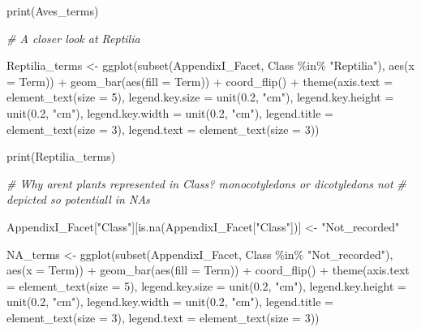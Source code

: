 \documentclass[
  12pt,
]{article}
\newenvironment{Shaded}{\begin{snugshade}}{\end{snugshade}}
\newcommand{\AttributeTok}[1]{\textcolor[rgb]{0.77,0.63,0.00}{#1}}
\newcommand{\CommentTok}[1]{\textcolor[rgb]{0.56,0.35,0.01}{\textit{#1}}}
\newcommand{\DecValTok}[1]{\textcolor[rgb]{0.00,0.00,0.81}{#1}}
\newcommand{\FloatTok}[1]{\textcolor[rgb]{0.00,0.00,0.81}{#1}}
\newcommand{\FunctionTok}[1]{\textcolor[rgb]{0.00,0.00,0.00}{#1}}
\newcommand{\NormalTok}[1]{#1}
\newcommand{\OtherTok}[1]{\textcolor[rgb]{0.56,0.35,0.01}{#1}}
\newcommand{\SpecialCharTok}[1]{\textcolor[rgb]{0.00,0.00,0.00}{#1}}
\newcommand{\StringTok}[1]{\textcolor[rgb]{0.31,0.60,0.02}{#1}}
\begin{document}
\begin{Shaded}
\begin{Highlighting}[]
\FunctionTok{print}\NormalTok{(Aves\_terms)}

\CommentTok{\# A closer look at Reptilia}

\NormalTok{Reptilia\_terms }\OtherTok{\textless{}{-}} \FunctionTok{ggplot}\NormalTok{(}\FunctionTok{subset}\NormalTok{(AppendixI\_Facet, Class }\SpecialCharTok{\%in\%} \StringTok{"Reptilia"}\NormalTok{), }\FunctionTok{aes}\NormalTok{(}\AttributeTok{x =}\NormalTok{ Term)) }\SpecialCharTok{+}
    \FunctionTok{geom\_bar}\NormalTok{(}\FunctionTok{aes}\NormalTok{(}\AttributeTok{fill =}\NormalTok{ Term)) }\SpecialCharTok{+} \FunctionTok{coord\_flip}\NormalTok{() }\SpecialCharTok{+} \FunctionTok{theme}\NormalTok{(}\AttributeTok{axis.text =} \FunctionTok{element\_text}\NormalTok{(}\AttributeTok{size =} \DecValTok{5}\NormalTok{),}
    \AttributeTok{legend.key.size =} \FunctionTok{unit}\NormalTok{(}\FloatTok{0.2}\NormalTok{, }\StringTok{"cm"}\NormalTok{), }\AttributeTok{legend.key.height =} \FunctionTok{unit}\NormalTok{(}\FloatTok{0.2}\NormalTok{, }\StringTok{"cm"}\NormalTok{), }\AttributeTok{legend.key.width =} \FunctionTok{unit}\NormalTok{(}\FloatTok{0.2}\NormalTok{,}
        \StringTok{"cm"}\NormalTok{), }\AttributeTok{legend.title =} \FunctionTok{element\_text}\NormalTok{(}\AttributeTok{size =} \DecValTok{3}\NormalTok{), }\AttributeTok{legend.text =} \FunctionTok{element\_text}\NormalTok{(}\AttributeTok{size =} \DecValTok{3}\NormalTok{))}

\FunctionTok{print}\NormalTok{(Reptilia\_terms)}

\CommentTok{\# Why arent plants represented in Class? monocotyledons or dicotyledons not}
\CommentTok{\# depicted so potentiall in NAs}

\NormalTok{AppendixI\_Facet[}\StringTok{"Class"}\NormalTok{][}\FunctionTok{is.na}\NormalTok{(AppendixI\_Facet[}\StringTok{"Class"}\NormalTok{])] }\OtherTok{\textless{}{-}} \StringTok{"Not\_recorded"}

\NormalTok{NA\_terms }\OtherTok{\textless{}{-}} \FunctionTok{ggplot}\NormalTok{(}\FunctionTok{subset}\NormalTok{(AppendixI\_Facet, Class }\SpecialCharTok{\%in\%} \StringTok{"Not\_recorded"}\NormalTok{), }\FunctionTok{aes}\NormalTok{(}\AttributeTok{x =}\NormalTok{ Term)) }\SpecialCharTok{+}
    \FunctionTok{geom\_bar}\NormalTok{(}\FunctionTok{aes}\NormalTok{(}\AttributeTok{fill =}\NormalTok{ Term)) }\SpecialCharTok{+} \FunctionTok{coord\_flip}\NormalTok{() }\SpecialCharTok{+} \FunctionTok{theme}\NormalTok{(}\AttributeTok{axis.text =} \FunctionTok{element\_text}\NormalTok{(}\AttributeTok{size =} \DecValTok{5}\NormalTok{),}
    \AttributeTok{legend.key.size =} \FunctionTok{unit}\NormalTok{(}\FloatTok{0.2}\NormalTok{, }\StringTok{"cm"}\NormalTok{), }\AttributeTok{legend.key.height =} \FunctionTok{unit}\NormalTok{(}\FloatTok{0.2}\NormalTok{, }\StringTok{"cm"}\NormalTok{), }\AttributeTok{legend.key.width =} \FunctionTok{unit}\NormalTok{(}\FloatTok{0.2}\NormalTok{,}
        \StringTok{"cm"}\NormalTok{), }\AttributeTok{legend.title =} \FunctionTok{element\_text}\NormalTok{(}\AttributeTok{size =} \DecValTok{3}\NormalTok{), }\AttributeTok{legend.text =} \FunctionTok{element\_text}\NormalTok{(}\AttributeTok{size =} \DecValTok{3}\NormalTok{))}


\end{Highlighting}
\end{Shaded}
\end{document}
